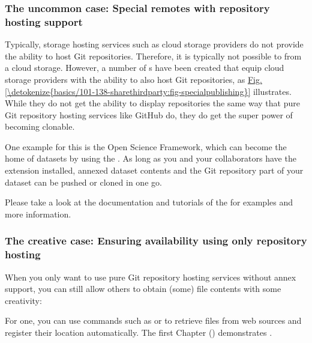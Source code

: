 \subsubsection{The uncommon case: Special remotes with repository hosting support}
\label{\detokenize{basics/101-138-sharethirdparty:the-uncommon-case-special-remotes-with-repository-hosting-support}}
\sphinxAtStartPar
Typically, storage hosting services such as cloud storage providers do not provide
the ability to host Git repositories.
Therefore, it is typically not possible to  from a cloud storage.
However, a number of {\hyperref[\detokenize{glossary:term-DataLad-extension}]{}}s have been created that equip cloud storage providers with the ability to also host Git repositories, as \hyperref[\detokenize{basics/101-138-sharethirdparty:fig-specialpublishing}]{Fig.\@ \ref{\detokenize{basics/101-138-sharethirdparty:fig-specialpublishing}}} illustrates.
While they do not get the ability to display repositories the same way that pure
Git repository hosting services like GitHub do, they do get the super power of becoming clonable.

\sphinxAtStartPar
One example for this is the Open Science Framework, which can become the home of datasets by using the .
As long as you and your collaborators have the extension installed, annexed dataset
contents and the Git repository part of your dataset can be pushed or cloned in one go.

\sphinxAtStartPar
Please take a look at the documentation and tutorials of the  for examples and more information.


\subsubsection{The creative case: Ensuring availability using only repository hosting}
\label{\detokenize{basics/101-138-sharethirdparty:the-creative-case-ensuring-availability-using-only-repository-hosting}}
\sphinxAtStartPar
When you only want to use pure Git repository hosting services without annex support, you can still allow others to obtain (some) file contents with some creativity:

\sphinxAtStartPar
For one, you can use commands such as  or   to retrieve files from web sources and register their location automatically.
The first Chapter {\hyperref[\detokenize{basics/basics-datasets:chapter-datasets}]{}} () demonstrates .

